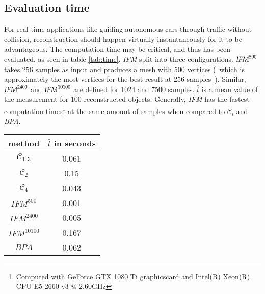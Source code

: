 \subsection{Evaluation time}
For real-time applications like guiding autonomous cars through traffic without collision,
 reconstruction should happen virtually instantaneously for it to be advantageous. 
 The computation time may be critical, and thus has been evaluated, as seen in table
  \ref{tab:time}. 
\emph{IFM} split into three configurations. $\emph{IFM}^{500}$ takes 256 samples as input 
and produces a mesh with 500 vertices (~which is approximately the most vertices for the best
 result at 256 samples~). Similar, $\emph{IFM}^{2400}$ and $\emph{IFM}^{10100}$ are defined 
 for 1024 and 7500 samples.
$\hat{t}$ is a mean value of the measurement for 100 reconstructed objects. 
Generally, \emph{IFM} has the fastest computation times\footnote{Computed with GeForce GTX 1080 Ti graphicscard and Intel(R) Xeon(R) CPU E5-2660 v3 @ 2.60GHz} at the same amount of samples when compared to $\mathcal{C}_i$ and \emph{BPA}.
\begin{center}
     \label{tab:time} 
        \begin{tabular}{| c | c |}
            \hline
            method & $\hat{t}$ in seconds \\\hline
            $\mathcal{C}_{1,3}$ & 0.061 \\\hline
             $\mathcal{C}_2$ & 0.15 \\\hline
             $\mathcal{C}_4$ & 0.043 \\\hline
             $IFM^{500}$ & 0.001 \\\hline
             $IFM^{2400}$ & 0.005 \\\hline
             $IFM^{10100}$ & 0.167 \\\hline
             $BPA$ & 0.062 \\\hline
        \end{tabular}
\end{center}

